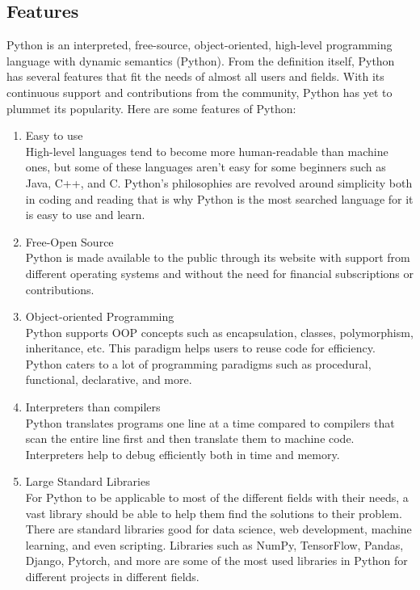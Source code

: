 \documentclass{article}
\begin{document}
\subsection*{Features}
\par
Python is an interpreted, free-source, object-oriented, high-level programming language with dynamic semantics (Python). From the definition itself, Python has several features that fit the needs of almost all users and fields. With its continuous support and contributions from the community, Python has yet to plummet its popularity. Here are some features of Python:

\begin{enumerate}

    \item Easy to use\\
    High-level languages tend to become more human-readable than machine ones, but some of these languages aren’t easy for some beginners such as Java, C++, and C. Python’s philosophies are revolved around simplicity both in coding and reading that is why Python is the most searched language for it is easy to use and learn.

    \item Free-Open Source\\
    Python is made available to the public through its website with support from different operating systems and without the need for financial subscriptions or contributions.

    \item Object-oriented Programming\\
    Python supports OOP concepts such as encapsulation, classes, polymorphism, inheritance, etc. This paradigm helps users to reuse code for efficiency. Python caters to a lot of programming paradigms such as procedural, functional, declarative, and more.

    \item Interpreters than compilers\\
    Python translates programs one line at a time compared to compilers that scan the entire line first and then translate them to machine code. Interpreters help to debug efficiently both in time and memory.

    \item Large Standard Libraries\\
    For Python to be applicable to most of the different fields with their needs, a vast library should be able to help them find the solutions to their problem. There are standard libraries good for data science, web development, machine learning, and even scripting. Libraries such as NumPy, TensorFlow, Pandas, Django, Pytorch, and more are some of the most used libraries in Python for different projects in different fields.


\end{enumerate}
\end{document}
